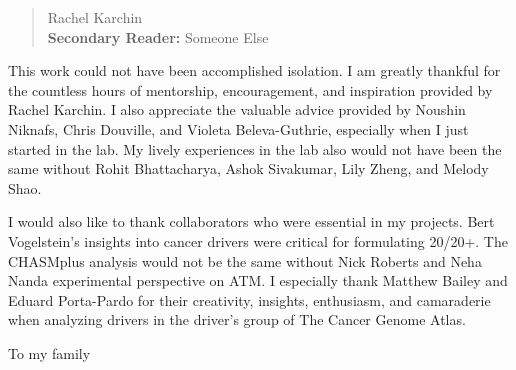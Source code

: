 
\begin{frontmatter}

\maketitle

\begin{abstract}

\Blindtext[3]

\vfill
{} Rachel Karchin \\
{\bf{Secondary Reader:}} Someone Else
\end{abstract}

\begin{acknowledgment}

This work could not have been accomplished isolation. I am greatly thankful for the countless hours of mentorship, encouragement, and inspiration provided by Rachel Karchin. I also appreciate the valuable advice provided by Noushin Niknafs, Chris Douville, and Violeta Beleva-Guthrie, especially when I just started in the lab. My lively experiences in the lab also would not have been the same without Rohit Bhattacharya, Ashok Sivakumar, Lily Zheng, and Melody Shao.

I would also like to thank collaborators who were essential in my projects. Bert Vogelstein's insights into cancer drivers were critical for formulating 20/20+. The CHASMplus analysis would not be the same without Nick Roberts and Neha Nanda experimental perspective on ATM. I especially thank Matthew Bailey and Eduard Porta-Pardo for their creativity, insights, enthusiasm, and camaraderie when analyzing drivers in the driver's group of The Cancer Genome Atlas.

\end{acknowledgment}

\begin{dedication}
 
To my family

\end{dedication}

\tableofcontents

\listoftables

\listoffigures

\end{frontmatter}
